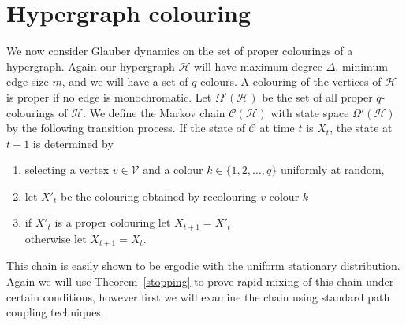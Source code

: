 \documentclass[11pt]{article}
\theoremstyle{definition}
\theoremstyle{remark}
\newcommand{\C}{\mathcal{C}}
\newcommand{\CH}{\mathcal{H}}
\newcommand{\CV}{\mathcal{V}}
\begin{document}
\section{Hypergraph colouring}\label{sec:colour}
We now consider Glauber dynamics on the set of proper colourings of a
hypergraph. Again our hypergraph $\CH$ will have maximum degree $\Delta$,
minimum edge size $m$, and we will have a set of $q$ colours. A colouring
of the vertices of $\CH$ is proper if no edge is monochromatic. Let
$\Omega'(\CH)$ be the set of all proper $q$-colourings of $\CH$. We define
the Markov chain $\C(\CH)$ with state space $\Omega'(\CH)$ by the following
transition process. If the state of $\C$ at time $t$ is $X_t$, the state at
$t+1$ is determined by
\begin{enumerate}
\item selecting a vertex $v\in \CV$ and a colour $k\in\{1,2,\ldots,q\}$
uniformly at random, \item let $X'_t$ be the colouring obtained by
recolouring $v$
colour $k$ \item if $X'_t$ is a proper colouring let $X_{t+1}=X'_t$\\
otherwise let $X_{t+1}=X_t$.
\end{enumerate}
This chain is easily shown to be ergodic with the uniform
stationary distribution. Again we will use Theorem~\ref{stopping}
to prove rapid mixing of this chain under certain conditions,
however first we will examine the chain using standard path
coupling techniques.
\end{document}
